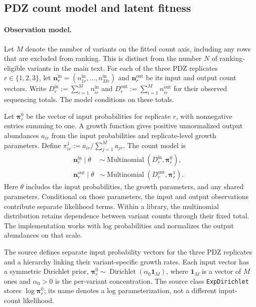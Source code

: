 \subsection{PDZ count model and latent fitness}
\label{app:pdz-model}

\paragraph{Observation model.}
Let $M$ denote the number of variants on the fitted count axis, including
any rows that are excluded from ranking. This is distinct from the number
$N$ of ranking-eligible variants in the main text. For each of the three
PDZ replicates $r\in\{1,2,3\}$, let
$\mathbf n_r^{\mathrm{in}}=(n_{1r}^{\mathrm{in}},\ldots,n_{Mr}^{\mathrm{in}})$
and $\mathbf n_r^{\mathrm{out}}$ be its input and output count vectors. Write
$D_r^{\mathrm{in}}:=\sum_{i=1}^M n_{ir}^{\mathrm{in}}$ and
$D_r^{\mathrm{out}}:=\sum_{i=1}^M n_{ir}^{\mathrm{out}}$ for their observed
sequencing totals. The model conditions on these totals.

Let $\boldsymbol\pi_r^0$ be the vector of input probabilities for replicate
$r$, with nonnegative entries summing to one. A growth function gives positive
unnormalized output abundances $a_{ir}$ from the input probabilities and
replicate-level growth parameters. Define
$\pi_{ir}^1:=a_{ir}/\sum_{j=1}^M a_{jr}$. The count model is
\begin{align}
\mathbf n_r^{\mathrm{in}}\mid\theta
&\sim\operatorname{Multinomial}(D_r^{\mathrm{in}},\boldsymbol\pi_r^0),\\
\mathbf n_r^{\mathrm{out}}\mid\theta
&\sim\operatorname{Multinomial}(D_r^{\mathrm{out}},\boldsymbol\pi_r^1).
\end{align}
Here $\theta$ includes the input probabilities, the growth parameters, and
any shared parameters. Conditional on those parameters, the input and output
observations contribute separate likelihood terms. Within a library, the
multinomial distribution retains dependence between variant counts through
their fixed total. The implementation works with log probabilities and
normalizes the output abundances on that scale.

The source defines separate input probability vectors for the three PDZ
replicates and a hierarchy linking their variant-specific growth rates.
Each input vector has a symmetric Dirichlet prior,
$\boldsymbol\pi_r^0\sim\operatorname{Dirichlet}(\alpha_0\mathbf1_M)$,
where $\mathbf1_M$ is a vector of $M$ ones and $\alpha_0>0$ is the
per-variant concentration. The source class \texttt{ExpDirichlet} stores
$\log\boldsymbol\pi_r^0$; its name denotes a log parameterization, not a
different input-count likelihood.

